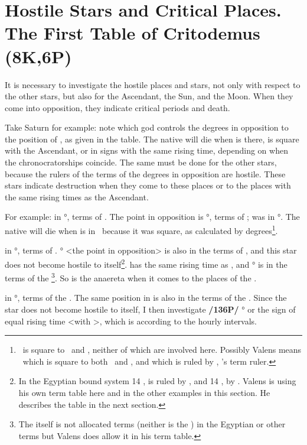 \section{Hostile Stars and Critical Places. The First Table of Critodemus (8K,6P)}

It is necessary to investigate the hostile places and stars, not only with respect to the other stars, but also for the Ascendant, the Sun, and the Moon. When they come into opposition, they indicate critical periods and death. 

Take Saturn for example: note which god controls the degrees in opposition to the position of \Saturn, as given in the table. The native will die when \Saturn\xspace is there, is square with the Ascendant, or in signs with the same rising time, depending on when the chronocratorships coincide. The
same must be done for the other stars, because the rulers of the terms of the degrees in opposition are hostile. These stars indicate destruction when they come to these places or to the places with the same rising times as the Ascendant.

For example: \Saturn\xspace in \Cancer\xspace 21°, terms of \Venus. The point in opposition is \Capricorn\xspace 21°, terms
of \Mars; \Mars\xspace was in \Taurus\xspace 27°. The native will die when \Saturn\xspace is in \Virgo\, because it was square, as calculated by degrees\footnote{\Virgo\, is square to \Gemini\, and \Sagittarius, neither of which are involved here. Possibly Valens means \Libra\, which is square to both \Cancer\, and \Capricorn, and which is ruled by \Venus, \Saturn's term ruler.}.

\Jupiter\xspace in \Scorpio\xspace 14°, terms of \Saturn. \Taurus\xspace 14° <the point in opposition> is also in the terms of \Saturn, and this star does not become hostile to itself\footnote{In the Egyptian bound system 14 \Scorpio, is ruled by \Mercury, and 14 \Taurus, by \Jupiter. Valens is using his own term table here and in the other examples in this section. He describes the table in the next section.}. \Leo\xspace has the same rising time as \Scorpio, and \Leo\xspace 14° is in the terms of the \Sun\footnote{The \Sun\xspace itself is not allocated terms (neither is the \Moon) in the Egyptian or other terms but Valens does allow it in his term table.}. So \Jupiter\xspace is the anaereta when it comes to the places of the \Sun.

\Mars\xspace in \Taurus\xspace 27°, terms of the \Sun. The same position in \Scorpio\xspace <the point in opposition> is also in the terms of the \Sun. Since the star does not become hostile to itself, I then investigate \textbf{/136P/} \Leo\xspace 27° or the sign of equal rising time <with \Taurus>, which is \Gemini\xspace according to the hourly intervals.

